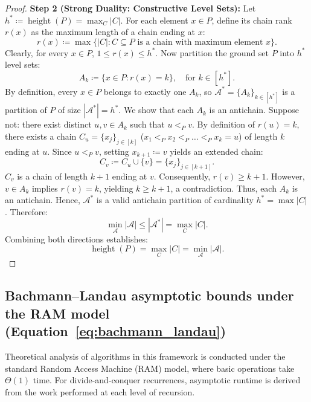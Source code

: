 \documentclass[11pt, letterpaper]{article}
\begin{document}
\begin{proof}
\medskip\noindent\textbf{Step 2 (Strong Duality: Constructive Level Sets):}
Let $h^* \coloneqq \operatorname{height}(P) = \max_C |C|$. For each element $x \in P$, define its chain rank $r(x)$ as the maximum length of a chain ending at $x$:
\begin{equation}
    r(x) \coloneqq \max \{|C| : C \subseteq P \text{ is a chain with maximum element } x\}.
\end{equation}
Clearly, for every $x \in P$, $1 \le r(x) \le h^*$. Now partition the ground set $P$ into $h^*$ level sets:
\begin{equation}
    A_k \coloneqq \{x \in P : r(x) = k\}, \quad \text{for } k \in [h^*].
\end{equation}
By definition, every $x \in P$ belongs to exactly one $A_k$, so $\mathcal{A}^* = \{A_k\}_{k \in [h^*]}$ is a partition of $P$ of size $|\mathcal{A}^*| = h^*$.
We show that each $A_k$ is an antichain. 
Suppose not: there exist distinct $u, v \in A_k$ such that $u <_P v$. 
By definition of $r(u) = k$, there exists a chain $C_u = \{x_j\}_{j \in [k]}$ ($x_1 <_P x_2 <_P \dots <_P x_k = u$) of length $k$ ending at $u$. 
Since $u <_P v$, setting $x_{k+1} \coloneqq v$ yields an extended chain:
\begin{equation}
    C_v \coloneqq C_u \cup \{v\} = \{x_j\}_{j \in [k+1]}.
\end{equation}
$C_v$ is a chain of length $k+1$ ending at $v$. Consequently, $r(v) \ge k+1$. 
However, $v \in A_k$ implies $r(v) = k$, yielding $k \ge k+1$, a contradiction. 
Thus, each $A_k$ is an antichain. 
Hence, $\mathcal{A}^*$ is a valid antichain partition of cardinality $h^* = \max |C|$. Therefore:
\begin{equation}
    \min_{\mathcal{A}} |\mathcal{A}| \le |\mathcal{A}^*| = \max_C |C|.
\end{equation}
Combining both directions establishes:
\begin{equation}
    \operatorname{height}(P) = \max_C |C| = \min_{\mathcal{A}} |\mathcal{A}|.
\end{equation}
\end{proof}

\subsection{Bachmann--Landau asymptotic bounds under the RAM model (\texorpdfstring{Equation~\ref{eq:bachmann_landau}}{Eq. 3})}
Theoretical analysis of algorithms in this framework is conducted under the standard Random Access Machine (RAM) model, where basic operations take $\Theta(1)$ time. For divide-and-conquer recurrences, asymptotic runtime is derived from the work performed at each level of recursion.
\end{document}
